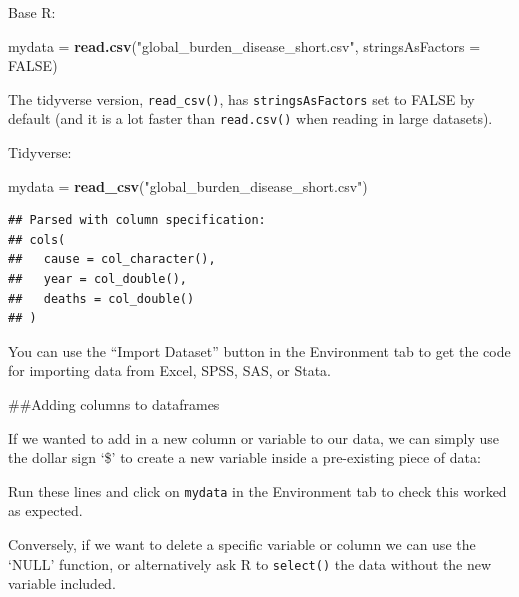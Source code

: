 \documentclass[]{book}
\makeatletter
\newenvironment{Shaded}{\begin{snugshade}}{\end{snugshade}}
\newcommand{\DataTypeTok}[1]{\textcolor[rgb]{0.13,0.29,0.53}{#1}}
\newcommand{\DecValTok}[1]{\textcolor[rgb]{0.00,0.00,0.81}{#1}}
\newcommand{\KeywordTok}[1]{\textcolor[rgb]{0.13,0.29,0.53}{\textbf{#1}}}
\newcommand{\NormalTok}[1]{#1}
\newcommand{\OperatorTok}[1]{\textcolor[rgb]{0.81,0.36,0.00}{\textbf{#1}}}
\newcommand{\OtherTok}[1]{\textcolor[rgb]{0.56,0.35,0.01}{#1}}
\newcommand{\StringTok}[1]{\textcolor[rgb]{0.31,0.60,0.02}{#1}}
\newenvironment{kframe}{%
\medskip{}
\setlength{\fboxsep}{.8em}
 \def\at@end@of@kframe{}%
 \ifinner\ifhmode%
  \def\at@end@of@kframe{\end{minipage}}%
  \begin{minipage}{\columnwidth}%
 \fi\fi%
 \def\FrameCommand##1{\hskip\@totalleftmargin \hskip-\fboxsep
 \colorbox{shadecolor}{##1}\hskip-\fboxsep
     \hskip-\linewidth \hskip-\@totalleftmargin \hskip\columnwidth}%
 \MakeFramed {\advance\hsize-\width
   \@totalleftmargin\z@ \linewidth\hsize
   \@setminipage}}%
 {\par\unskip\endMakeFramed%
 \at@end@of@kframe}
\renewenvironment{Shaded}{\begin{kframe}}{\end{kframe}}
\theoremstyle{definition}
\theoremstyle{definition}
\theoremstyle{definition}
\theoremstyle{remark}
\makeatother
\begin{document}
Base R:

\begin{Shaded}
\begin{Highlighting}[]
\NormalTok{mydata =}\StringTok{ }\KeywordTok{read.csv}\NormalTok{(}\StringTok{"global_burden_disease_short.csv"}\NormalTok{, }\DataTypeTok{stringsAsFactors =} \OtherTok{FALSE}\NormalTok{)}
\end{Highlighting}
\end{Shaded}

The tidyverse version, \texttt{read\_csv()}, has
\texttt{stringsAsFactors} set to FALSE by default (and it is a lot
faster than \texttt{read.csv()} when reading in large datasets).

Tidyverse:

\begin{Shaded}
\begin{Highlighting}[]
\NormalTok{mydata =}\StringTok{ }\KeywordTok{read_csv}\NormalTok{(}\StringTok{"global_burden_disease_short.csv"}\NormalTok{)}
\end{Highlighting}
\end{Shaded}

\begin{verbatim}
## Parsed with column specification:
## cols(
##   cause = col_character(),
##   year = col_double(),
##   deaths = col_double()
## )
\end{verbatim}

You can use the ``Import Dataset'' button in the Environment tab to get
the code for importing data from Excel, SPSS, SAS, or Stata.

\#\#Adding columns to dataframes

If we wanted to add in a new column or variable to our data, we can
simply use the dollar sign `\$' to create a new variable inside a
pre-existing piece of data:

\begin{Shaded}
\end{Shaded}

Run these lines and click on \texttt{mydata} in the Environment tab to
check this worked as expected.

Conversely, if we want to delete a specific variable or column we can
use the `NULL' function, or alternatively ask R to \texttt{select()} the
data without the new variable included.
\end{document}
